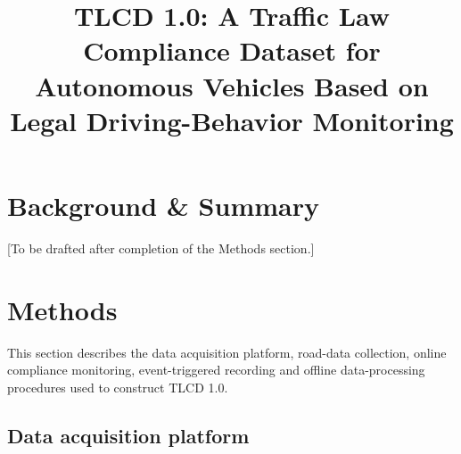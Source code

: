 \documentclass[pdflatex,sn-mathphys-num]{sn-jnl}
\begin{document}

\title[TLCD 1.0]{TLCD 1.0: A Traffic Law Compliance Dataset for Autonomous Vehicles Based on Legal Driving-Behavior Monitoring}

\author[1]{ }



\maketitle

\section{Background \& Summary}\label{sec:background-summary}

[To be drafted after completion of the Methods section.]

\section{Methods}\label{sec:methods}

This section describes the data acquisition platform, road-data collection, online compliance monitoring, event-triggered recording and offline data-processing procedures used to construct TLCD 1.0.

\subsection{Data acquisition platform}\label{subsec:data-acquisition-platform}
\end{document}
